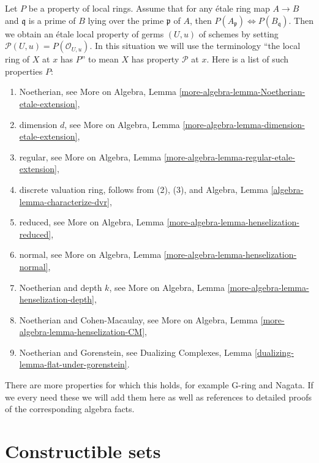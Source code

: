 \begin{remark}
\label{remark-list-properties-local-ring-local-etale-topology}
Let $P$ be a property of local rings. Assume that for any
\'etale ring map $A \to B$ and $\mathfrak q$ is a prime of $B$ lying over
the prime $\mathfrak p$ of $A$, then
$P(A_\mathfrak p) \Leftrightarrow P(B_\mathfrak q)$.
Then we obtain an \'etale local property of germs $(U, u)$ of schemes
by setting $\mathcal{P}(U, u) = P(\mathcal{O}_{U, u})$.
In this situation we will use the terminology
``the local ring of $X$ at $x$ has $P$'' to mean
$X$ has property $\mathcal{P}$ at $x$.
Here is a list of such properties $P$:
\begin{enumerate}
\item Noetherian, see
More on Algebra, Lemma \ref{more-algebra-lemma-Noetherian-etale-extension},
\item dimension $d$, see
More on Algebra, Lemma \ref{more-algebra-lemma-dimension-etale-extension},
\item regular, see
More on Algebra, Lemma \ref{more-algebra-lemma-regular-etale-extension},
\item discrete valuation ring, follows from (2), (3), and
Algebra, Lemma \ref{algebra-lemma-characterize-dvr},
\item reduced, see
More on Algebra, Lemma \ref{more-algebra-lemma-henselization-reduced},
\item normal, see
More on Algebra, Lemma \ref{more-algebra-lemma-henselization-normal},
\item Noetherian and depth $k$, see
More on Algebra, Lemma \ref{more-algebra-lemma-henselization-depth},
\item Noetherian and Cohen-Macaulay, see
More on Algebra, Lemma \ref{more-algebra-lemma-henselization-CM},
\item Noetherian and Gorenstein, see
Dualizing Complexes, Lemma \ref{dualizing-lemma-flat-under-gorenstein}.
\end{enumerate}
There are more properties for which this holds, for example G-ring and
Nagata. If we every need these we will add them here
as well as references to detailed proofs of the corresponding
algebra facts.
\end{remark}







\section{Constructible sets}
\label{section-constructible}

